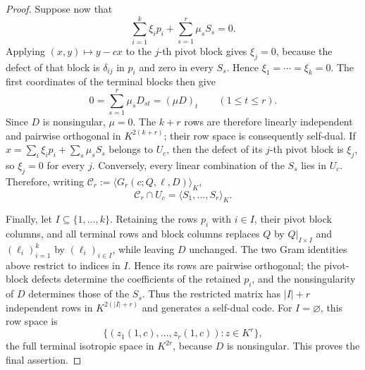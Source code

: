 \documentclass[12pt]{article}
\begin{document}
\begin{proof}
Suppose now that
\[
 \sum_{i=1}^k\xi_i p_i+\sum_{s=1}^r\mu_sS_s=0.
\]
Applying \((x,y)\mapsto y-cx\) to the \(j\)-th pivot block gives
\(\xi_j=0\), because the defect of that block is \(\delta_{ij}\) in
\(p_i\) and zero in every \(S_s\).  Hence \(\xi_1=\cdots=\xi_k=0\).
The first coordinates of the terminal blocks then give
\[
 0=\sum_{s=1}^r\mu_sD_{st}=(\mu D)_t
 \qquad(1\le t\le r).
\]
Since \(D\) is nonsingular, \(\mu=0\).  The \(k+r\) rows are therefore
linearly independent and pairwise orthogonal in \(K^{2(k+r)}\); their row
space is consequently self-dual.  If
\(x=\sum_i\xi_ip_i+\sum_s\mu_sS_s\) belongs to \(U_c\), then the defect of
its \(j\)-th pivot block is \(\xi_j\), so \(\xi_j=0\) for every \(j\).
Conversely, every linear combination of the \(S_s\) lies in \(U_c\).
Therefore, writing
\(\mathcal C_r:=\langle G_r(c;Q,\ell,D)\rangle_K\),
\[
 \mathcal C_r\cap U_c
   =\langle S_1,\ldots,S_r\rangle_K.
\]

Finally, let \(I\subseteq\{1,\ldots,k\}\).  Retaining the rows \(p_i\)
with \(i\in I\), their pivot block columns, and all terminal rows and block
columns replaces \(Q\) by \(Q|_{I\times I}\) and \((\ell_i)_{i=1}^k\) by
\((\ell_i)_{i\in I}\), while leaving \(D\) unchanged.  The two Gram
identities above restrict to indices in \(I\).  Hence its rows are pairwise
orthogonal; the pivot-block defects determine the coefficients of the
retained \(p_i\), and the nonsingularity of \(D\) determines those of the
\(S_s\).  Thus the restricted matrix has \(|I|+r\) independent rows in
\(K^{2(|I|+r)}\) and generates a self-dual code.  For
\(I=\varnothing\), this row space is
\[
 \{(z_1(1,c),\ldots,z_r(1,c)):z\in K^r\},
\]
the full terminal isotropic space in \(K^{2r}\), because \(D\) is
nonsingular.  This proves the final assertion.
\end{proof}
\end{document}
